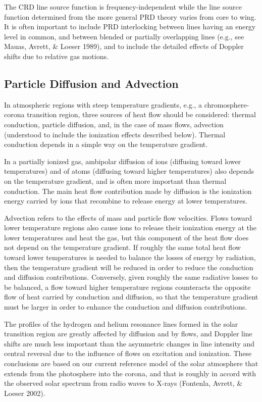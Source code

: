 \documentclass[11pt,twoside]{article}
\begin{document}
The CRD line source function is frequency-independent while the line source
function determined from the more general PRD theory varies from core to
wing.  It is often important to include PRD interlocking between lines having 
an energy level in common, and between blended or partially overlapping
lines (e.g., see Mauas, Avrett, \& Loeser 1989), and to include the detailed 
effects of Doppler shifts due to relative gas motions.

\subsection{Particle Diffusion and Advection}

In atmospheric regions with steep temperature gradients, e.g., a
chromosphere-corona transition region, three sources of heat flow should
be considered: thermal conduction, particle diffusion, and, in the case
of mass flows, advection (understood to include the ionization effects
described below).  Thermal conduction depends in a simple way on the
temperature gradient.

In a partially ionized gas, ambipolar diffusion
of ions (diffusing toward lower temperatures) and of atoms (diffusing
toward higher temperatures) also depends on the temperature gradient, 
and is often more important than thermal conduction.  The main heat flow 
contribution made by diffusion is the ionization energy carried by ions 
that recombine to release energy at lower temperatures.

Advection refers to the effects of mass and particle flow velocities.  Flows
toward lower temperature regions also cause ions to release their ionization
energy at the lower temperatures and heat the gas, but this component 
of the heat flow does not depend on the temperature gradient. If roughly 
the same total heat flow toward lower temperatures is needed to balance 
the losses of energy by radiation, then the temperature gradient will be
reduced in order to reduce the conduction and diffusion contributions.
Conversely, given roughly the same radiative losses to be balanced,
a flow toward higher temperature regions counteracts the opposite flow of
heat carried by conduction and diffusion, so that the temperature gradient
must be larger in order to enhance the conduction and diffusion contributions.
 
The profiles of the hydrogen and helium resonance lines formed in 
the solar transition region are greatly affected by diffusion and by flows, 
and Doppler line shifts are much less important than the asymmetric changes 
in line intensity and central reversal due to the influence of flows on 
excitation and ionization. These conclusions are based on our current reference 
model of the solar atmosphere that extends from the photosphere into the
corona, and that is roughly in accord with the observed solar spectrum
from radio waves to X-rays (Fontenla, Avrett, \& Loeser 2002).  
\end{document}
